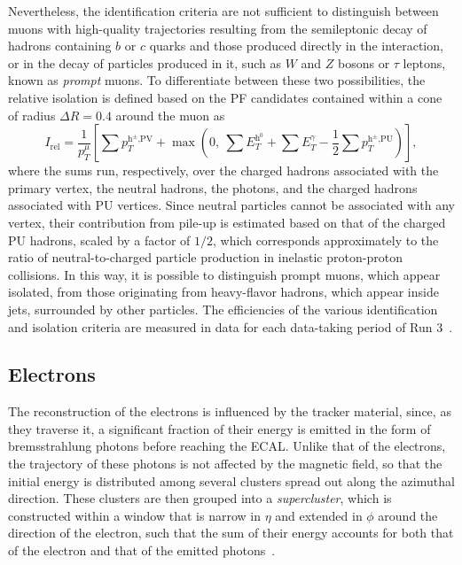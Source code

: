 Nevertheless, the identification criteria are not sufficient to distinguish between muons with high-quality trajectories resulting from the semileptonic decay of hadrons containing $b$ or $c$ quarks and those produced directly in the interaction, or in the decay of particles produced in it, such as $W$ and $Z$ bosons or $\tau$ leptons, known as \textit{prompt} muons. To differentiate between these two possibilities, the relative isolation is defined based on the PF candidates contained within a cone of radius $\Delta R = 0.4$ around the muon as
\begin{equation}
    I_\text{rel} = \frac{1}{p_T^\mu}\left[\sum p_T^\text{h$^\pm$,PV} + \max\left(0,\ \sum E_T^\text{h$^0$} + \sum E_T^{\gamma} - \frac{1}{2}\sum p_T^\text{h$^\pm$,PU}\right)\right],
    \label{eq:reliso}
\end{equation}
where the sums run, respectively, over the charged hadrons associated with the primary vertex, the neutral hadrons, the photons, and the charged hadrons associated with PU vertices. Since neutral particles cannot be associated with any vertex, their contribution from pile-up is estimated based on that of the charged PU hadrons, scaled by a factor of $1/2$, which corresponds approximately to the ratio of neutral-to-charged particle production in inelastic proton-proton collisions. In this way, it is possible to distinguish prompt muons, which appear isolated, from those originating from heavy-flavor hadrons, which appear inside jets, surrounded by other particles. The efficiencies of the various identification and isolation criteria are measured in data for each data-taking period of Run 3~\cite{CMS-DP-2024-067}.

\subsection{Electrons}
\label{subsec:Electrons}
%
The reconstruction of the electrons is influenced by the tracker material, since, as they traverse it, a significant fraction of their energy is emitted in the form of bremsstrahlung photons before reaching the ECAL. Unlike that of the electrons, the trajectory of these photons is not affected by the magnetic field, so that the initial energy is distributed among several clusters spread out along the azimuthal direction. These clusters are then grouped into a \textit{supercluster}, which is constructed within a window that is narrow in $\eta$ and extended in $\phi$ around the direction of the electron, such that the sum of their energy accounts for both that of the electron and that of the emitted photons~\cite{CMS:2020uim}.

